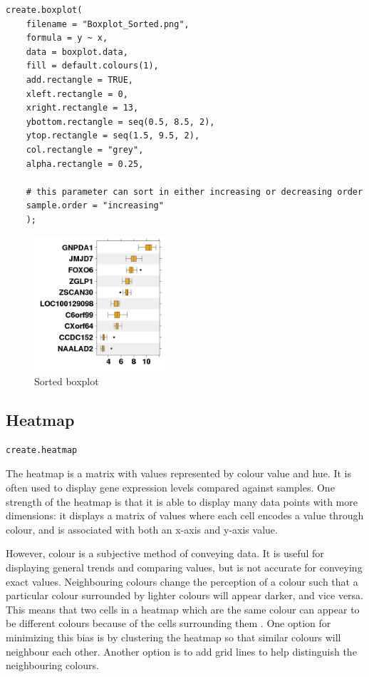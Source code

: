 \documentclass[letterpaper]{article}
\begin{document}
\begin{verbatim}
create.boxplot(
    filename = "Boxplot_Sorted.png",
    formula = y ~ x, 
    data = boxplot.data,
    fill = default.colours(1),
    add.rectangle = TRUE,
    xleft.rectangle = 0,
    xright.rectangle = 13,
    ybottom.rectangle = seq(0.5, 8.5, 2),
    ytop.rectangle = seq(1.5, 9.5, 2),
    col.rectangle = "grey",
    alpha.rectangle = 0.25,
    
    # this parameter can sort in either increasing or decreasing order
    sample.order = "increasing"
    );
\end{verbatim}
\begin{figure}[!ht]
  \begin{center}
     \includegraphics[width=50mm]{Figures/Boxplot_Sorted.png}
     \caption{Sorted boxplot}
  \end{center}
\end{figure}

\subsection{Heatmap}
\begin{verbatim}
create.heatmap
\end{verbatim}

The heatmap is a matrix with values represented by colour value and hue. It is often used to display gene expression levels compared against samples. One strength of the heatmap is that it is able to display many data points with more dimensions: it displays a matrix of values where each cell encodes a value through colour, and is associated with both an x-axis and y-axis value. 

However, colour is a subjective method of conveying data. It is useful for displaying general trends and comparing values, but is not accurate for conveying exact values. Neighbouring colours change the perception of a colour such that a particular colour surrounded by lighter colours will appear darker, and vice versa. This means that two cells in a heatmap which are the same colour can appear to be different colours because of the cells surrounding them \cite{wong2}. One option for minimizing this bias is by clustering the heatmap so that similar colours will neighbour each other. Another option is to add grid lines to help distinguish the neighbouring colours. 
\end{document}
